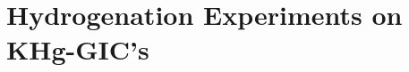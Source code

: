 \setcounter{chapter}{4}
\chapter{Hydrogenation Experiments on KHg-GIC's}
\pagestyle{headings}
\label{hydrog}







